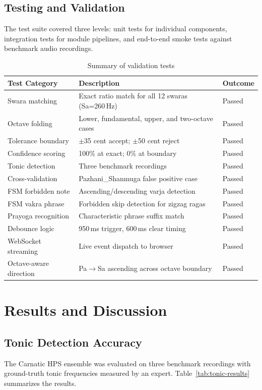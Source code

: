\documentclass[12pt,a4paper]{report}
\numberwithin{equation}{chapter}
\begin{document}
\section{Testing and Validation}
The test suite covered three levels: unit tests for individual components, integration tests for module pipelines, and end-to-end smoke tests against benchmark audio recordings.

\begin{table}[htbp]
\centering
\caption{Summary of validation tests}
\label{tab:test-results}
\begin{tabular}{|l|p{5cm}|l|}
\hline
\textbf{Test Category} & \textbf{Description} & \textbf{Outcome} \\
\hline
Swara matching & Exact ratio match for all 12 swaras (Sa=260\,Hz) & Passed \\
Octave folding & Lower, fundamental, upper, and two-octave cases & Passed \\
Tolerance boundary & $\pm$35 cent accept; $\pm$50 cent reject & Passed \\
Confidence scoring & 100\% at exact; 0\% at boundary & Passed \\
Tonic detection & Three benchmark recordings & Passed \\
Cross-validation & Pazhani\_Shanmuga false positive case & Passed \\
FSM forbidden note & Ascending/descending varja detection & Passed \\
FSM vakra phrase & Forbidden skip detection for zigzag ragas & Passed \\
Prayoga recognition & Characteristic phrase suffix match & Passed \\
Debounce logic & 950\,ms trigger, 600\,ms clear timing & Passed \\
WebSocket streaming & Live event dispatch to browser & Passed \\
Octave-aware direction & Pa$\to$Sa ascending across octave boundary & Passed \\
\hline
\end{tabular}
\end{table}

\chapter{Results and Discussion}
\section{Tonic Detection Accuracy}
The Carnatic HPS ensemble was evaluated on three benchmark recordings with ground-truth tonic frequencies measured by an expert. Table~\ref{tab:tonic-results} summarizes the results.
\end{document}
